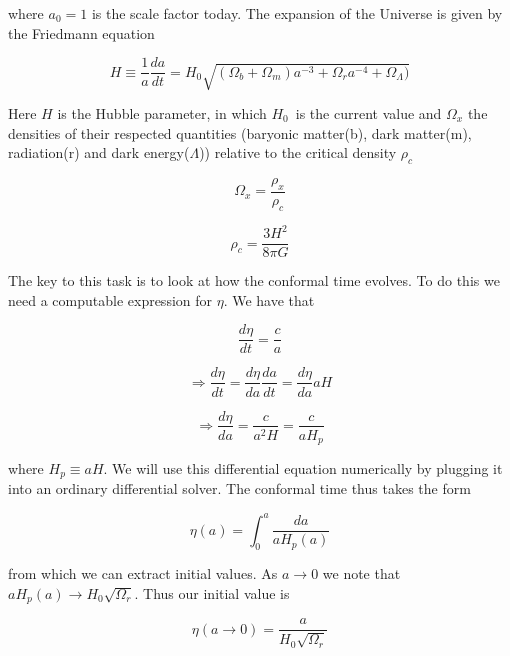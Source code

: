 \documentclass[norsk,a4paper,12pt]{article}
\begin{document}
where $a_0 = 1$ is the scale factor today. The expansion of the Universe is given by the Friedmann equation

\begin{equation}
 H \equiv \frac{1}{a}\frac{da}{dt} = H_0\sqrt{(\Omega_b + \Omega_m)a^{-3} + \Omega_ra^{-4} + \Omega_{\Lambda})}
\end{equation}

Here $H$ is the Hubble parameter, in which $H_0$ is the current value and $\Omega_x$ the densities of their respected quantities (baryonic matter(b), dark matter(m), radiation(r) and dark energy($\Lambda$)) relative to the critical density $\rho_c$

\begin{equation}
 \Omega_x = \frac{\rho_x}{\rho_c}
\end{equation}

\begin{equation}
 \rho_c = \frac{3H^2}{8\pi G}
\end{equation}

The key to this task is to look at how the conformal time evolves. To do this we need a computable expression for  $\eta$. We have that

\begin{equation}
 \frac{d\eta}{dt} = \frac{c}{a}
\end{equation}

\begin{equation}
 \Rightarrow \frac{d\eta}{dt} = \frac{d\eta}{da}\frac{da}{dt} = \frac{d\eta}{da}aH
\end{equation}

\begin{equation}
 \Rightarrow \frac{d\eta}{da} = \frac{c}{a^2H} = \frac{c}{aH_p}
\end{equation}


where $H_p \equiv aH$. We will use this differential equation numerically by plugging it into an ordinary differential solver. The conformal time thus takes the form

\begin{equation}
 \eta(a) = \int_0^a \frac{da}{a H_p(a)} 
\end{equation}


from which we can extract initial values. As $a\rightarrow 0$ we note that $aH_p(a) \rightarrow H_0\sqrt{\Omega_r}$. Thus our initial value is  

\begin{equation}
 \eta(a\rightarrow 0) = \frac{a}{H_0\sqrt{\Omega_r}}
\end{equation}
\end{document}
